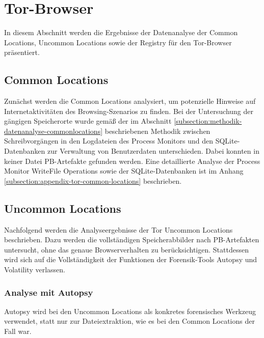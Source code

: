 

\newpage




\section{Tor-Browser}\label{section:ergebnisse-tor}

In diesem Abschnitt werden die Ergebnisse der Datenanalyse der Common Locations, Uncommon Locations sowie der Registry für den Tor-Browser präsentiert.

\subsection*{Common Locations}
Zunächst werden die Common Locations analysiert, um potenzielle Hinweise auf Internetaktivitäten des Browsing-Szenarios zu finden. Bei der Untersuchung der gängigen Speicherorte wurde gemäß der im Abschnitt \ref{subsection:methodik-datenanalyse-commonlocations} beschriebenen Methodik zwischen Schreibvorgängen in den Logdateien des Process Monitors und den SQLite-Datenbanken zur Verwaltung von Benutzerdaten unterschieden. Dabei konnten in keiner Datei PB-Artefakte gefunden werden. Eine detaillierte Analyse der Process Monitor \grqq{}WriteFile\grqq{} Operations sowie der SQLite-Datenbanken ist im Anhang \ref{subsection:appendix-tor-common-locations} beschrieben.

\subsection*{Uncommon Locations}
Nachfolgend werden die Analyseergebnisse der Tor Uncommon Locations beschrieben.
Dazu werden die vollständigen Speicherabbilder nach PB-Artefakten untersucht, ohne das genaue Browserverhalten zu berücksichtigen. Stattdessen wird sich auf die Vollständigkeit der Funktionen der Forensik-Tools Autopsy und Volatility verlassen.

\subsubsection*{Analyse mit Autopsy}
Autopsy wird bei den Uncommon Locations als konkretes forensisches Werkzeug verwendet, statt nur zur Dateiextraktion, wie es bei den Common Locations der Fall war.

